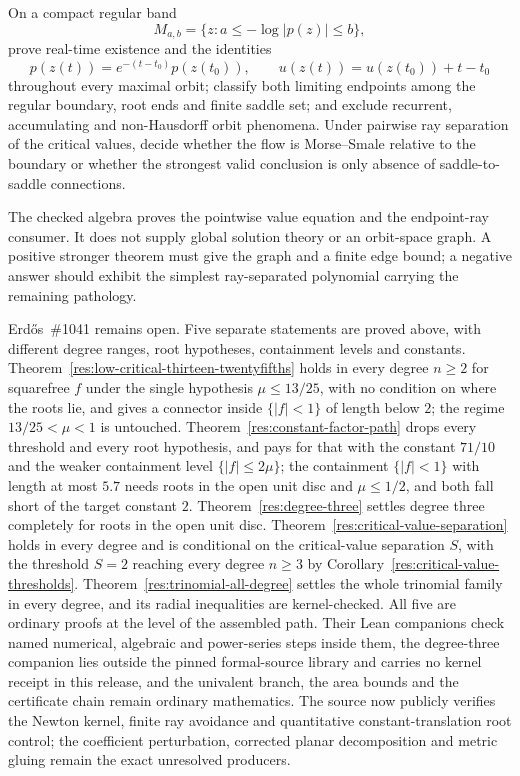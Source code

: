 \documentclass[11pt]{article}
\begin{document}
\begin{problem}\label{prob:globalflow1041}
On a compact regular band
\[
 M_{a,b}=\{z:a\le-\log|p(z)|\le b\},
\]
prove real-time existence and the identities
\[
 p(z(t))=e^{-(t-t_0)}p(z(t_0)),\qquad
 u(z(t))=u(z(t_0))+t-t_0
\]
throughout every maximal orbit; classify both limiting endpoints among the
regular boundary, root ends and finite saddle set; and exclude recurrent,
accumulating and non-Hausdorff orbit phenomena.  Under pairwise ray separation
of the critical values, decide whether the flow is Morse--Smale relative to the
boundary or whether the strongest valid conclusion is only absence of
saddle-to-saddle connections.
\end{problem}

The checked algebra proves the pointwise value equation and the endpoint-ray
consumer.  It does not supply global solution theory or an orbit-space graph.
A positive stronger theorem must give the graph and a finite edge bound; a
negative answer should exhibit the simplest ray-separated polynomial carrying
the remaining pathology.

Erd\H{o}s~\#1041 remains open.  Five separate statements are proved above,
with different degree ranges, root hypotheses, containment levels and
constants.  Theorem~\ref{res:low-critical-thirteen-twentyfifths} holds in
every degree $n\ge2$ for squarefree $f$ under the single hypothesis
$\mu\le13/25$, with no condition on where the roots lie, and gives a
connector inside $\{|f|<1\}$ of length below $2$; the regime
$13/25<\mu<1$ is untouched.  Theorem~\ref{res:constant-factor-path} drops
every threshold and every root hypothesis, and pays for that with the
constant $71/10$ and the weaker containment level $\{|f|\le2\mu\}$; the
containment $\{|f|<1\}$ with length at most $5.7$ needs roots in the open
unit disc and $\mu\le1/2$, and both fall short of the target constant $2$.
Theorem~\ref{res:degree-three} settles degree three completely for roots in
the open unit disc.  Theorem~\ref{res:critical-value-separation} holds in
every degree and is conditional on the critical-value separation $S$, with the
threshold $S=2$ reaching every degree $n\ge3$ by
Corollary~\ref{res:critical-value-thresholds}.
Theorem~\ref{res:trinomial-all-degree} settles the whole trinomial family in
every degree, and its radial inequalities are kernel-checked.  All five are
ordinary proofs at the level of the assembled path.  Their Lean companions check named numerical, algebraic and
power-series steps inside them, the degree-three companion lies outside the
pinned formal-source library and carries no kernel receipt in this release,
and the univalent branch, the area bounds and the certificate chain remain
ordinary mathematics.  The source now publicly verifies the Newton
kernel, finite ray avoidance and quantitative constant-translation root
control; the coefficient perturbation, corrected planar decomposition and
metric gluing remain the exact unresolved producers.
\end{document}
